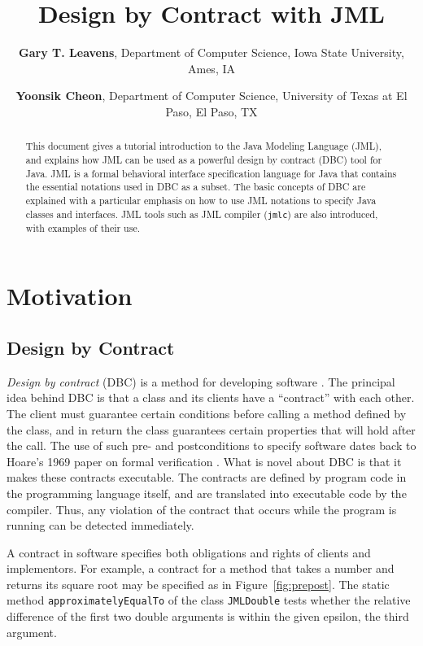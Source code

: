 \documentclass{jotarticle}
\title{Design by Contract with JML}
\author{\textbf{Gary T. Leavens}, 
  Department of Computer Science, 
  Iowa State University,
  Ames, IA
  \and
  \textbf{Yoonsik Cheon},
  Department of Computer Science,
  University of Texas at El Paso,
  El Paso, TX}
\begin{document}

\begin{abstract}
  This document gives a tutorial introduction to the Java Modeling
  Language (JML), and explains how JML can be used as a powerful
  design by contract (DBC) tool for Java. JML is a formal behavioral
  interface specification language for Java that contains the
  essential notations used in DBC as a subset.  The basic concepts of
  DBC are explained with a particular emphasis on how to use JML
  notations to specify Java classes and interfaces.  JML tools such as
  JML compiler (\texttt{jmlc}) are also introduced, with examples of
  their use.
\end{abstract}


\def\RESULT{\texttt{\char'134result}}
\def\OLD#1{\texttt{\char'134old({#1})}}

\section{Motivation}
\subsection{Design by Contract}

\emph{Design by contract} (DBC) is a method for developing software
\cite{Meyer92a}.  
The principal idea behind DBC is that a class and its clients have a
``contract'' with each other. The client must guarantee certain
conditions before calling a method defined by the class, and in return
the class guarantees certain properties that will hold after the call.
The use of such pre- and postconditions to specify software dates back
to Hoare's 1969 paper on formal verification \cite{Hoare69}.
What is novel about DBC is that it makes these contracts
executable.  The contracts are defined 
by program code in the programming language itself, and are translated
into executable code by the compiler.  Thus, any violation of the
contract that occurs while the program is running can be detected immediately.

A contract in software specifies both obligations and rights of
clients and implementors.
For example, a contract for a method that takes a
number and returns its square root may be specified as in
Figure~\ref{fig:prepost}.
The static method \texttt{approximatelyEqualTo} of the class
\texttt{JMLDouble} tests whether the relative difference of 
the first two double arguments is within the given epsilon,
the third argument.
\end{document}
